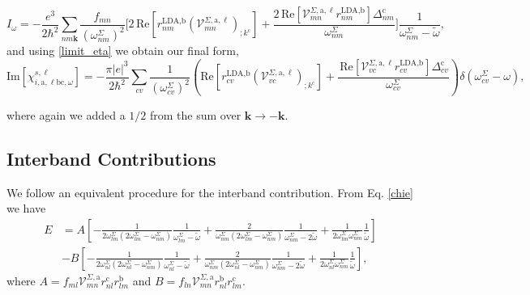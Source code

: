 \documentclass[letterpaper,aps]{revtex4}
\begin{document}
\begin{equation}\label{wchii_simplified}
I_{\omega}
=   -\frac{e^3}{2\hbar^2}\sum_{nm\mathbf{k}}
    \frac{f_{mn}}{(\omega^{\Sigma}_{nm})^{2}}
\Biggl[
    2\,\mathrm{Re}\left[r^{\text{LDA,b}}_{nm}
    \left(\mathcal{V}^{\Sigma,\text{a},\ell}_{mn}\right)_{;k^{\text{c}}}\right]
+   \frac{2\,\mathrm{Re}\left[\mathcal{V}^{\Sigma,\text{a},\ell}_{mn}
    r^{\text{LDA,b}}_{nm}\right]\Delta^{\text{c}}_{nm}}{\omega^{\Sigma}_{nm}} 
\Biggr]\frac{1}{\omega^{\Sigma}_{nm}-\tilde\omega}
,
\end{equation}
and using \eqref{limit_eta} we obtain our final form,
\begin{equation}
\mathrm{Im}[\chi_{i,\text{a},\ell\text{b}\text{c},\omega}^{s,\ell}]
=   -\frac{\pi\vert e\vert^3}{2\hbar^2}
    \sum_{cv}\frac{1}{(\omega^{\Sigma}_{cv})^{2}}
\left(
    \mathrm{Re}\left[r^{\text{LDA,b}}_{cv}
    \left(\mathcal{V}^{\Sigma,\text{a},\ell}_{vc}\right)_{;k^{\text{c}}}\right]
+   \frac{\,\mathrm{Re}\left[\mathcal{V}^{\Sigma,\text{a},\ell}_{vc}
    r^{\text{LDA,b}}_{cv}\right]\Delta^{\text{c}}_{cv}}{\omega^{\Sigma}_{cv}} 
\right)\delta(\omega^{\Sigma}_{cv}-\omega)
,
\end{equation}

where again we added a $1/2$ from the sum over 
$\mathbf{k} \rightarrow - \mathbf{k}$.



\subsection{Interband Contributions}

We follow an equivalent procedure for the interband contribution. 
From Eq. \eqref{chie} we have
\begin{align}\label{ewithaandb}  
E&=  
A
\left[
-\frac{1}{2\omega^\Sigma_{lm}(2\omega^\Sigma_{lm}-\omega^\Sigma_{nm})}\frac{1}{\omega^\Sigma_{lm}-\tilde\omega}
+\frac{2}{\omega^\Sigma_{nm}(2\omega^\Sigma_{lm}-\omega^\Sigma_{nm})}\frac{1}{\omega^\Sigma_{nm}-2\tilde\omega}
+\frac{1}{2\omega^\Sigma_{lm}\omega^\Sigma_{nm}}\frac{1}{\tilde\omega}
\right]
\nonumber\\
&- 
B
\left[
-\frac{1}{2\omega^\Sigma_{nl}(2\omega^\Sigma_{nl}-\omega^\Sigma_{nm})}\frac{1}{\omega^\Sigma_{nl}-\tilde\omega}
+\frac{2}{\omega^\Sigma_{nm}(2\omega^\Sigma_{nl}-\omega^\Sigma_{nm})}\frac{1}{\omega^\Sigma_{nm}-2\tilde\omega}
+\frac{1}{2\omega^\Sigma_{nl}\omega^\Sigma_{nm}}\frac{1}{\tilde\omega}
\right]
,
\end{align}  
where 
$A=f_{ml}\mathcal{V}^{\Sigma,\text{a}}_{mn}r^{\text{c}}_{nl}r^{\text{b}}_{lm}$   
and
$B=f_{ln}\mathcal{V}^{\Sigma,\text{a}}_{mn}r^{\text{b}}_{nl}r^{\text{c}}_{lm}$.
\end{document}
